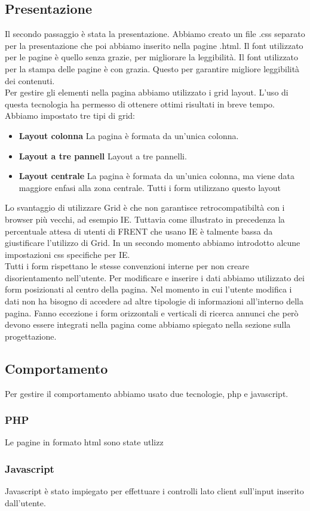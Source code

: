 \documentclass[1_relazione.tex]{subfiles}
\begin{document}
\subsection{Presentazione}
Il secondo passaggio è stata la presentazione.  Abbiamo creato un file .css separato per la presentazione che poi abbiamo inserito nella pagine .html. Il font utilizzato per le pagine è quello senza grazie, per migliorare la leggibilità. Il font utilizzato per la stampa delle pagine è con grazia. Questo per garantire migliore leggibilità dei contenuti.  \\

Per gestire gli elementi nella pagina abbiamo utilizzato i grid layout. L'uso di questa tecnologia ha permesso di ottenere ottimi risultati in breve tempo. Abbiamo impostato tre tipi di grid:
\begin{itemize}
\item \textbf{Layout colonna}  La pagina è formata da un'unica colonna.
\item \textbf{Layout a tre pannell} Layout a tre pannelli.
\item \textbf{Layout centrale} La pagina è formata da un'unica colonna, ma viene data maggiore enfasi alla zona centrale. Tutti i form utilizzano questo layout
\end{itemize}

Lo svantaggio di utilizzare Grid è che non garantisce retrocompatibiltà con i browser più vecchi, ad esempio IE. Tuttavia come illustrato in precedenza la percentuale attesa di utenti di FRENT che usano IE è talmente bassa da giustificare l'utilizzo di Grid. In un secondo momento abbiamo introdotto alcune impostazioni css specifiche per IE. \\

Tutti i form rispettano le stesse convenzioni interne per non creare disorientamento nell'utente. Per modificare e inserire i dati abbiamo utilizzato dei form posizionati al centro della pagina. Nel momento in cui l'utente modifica i dati non ha bisogno di accedere ad altre tipologie di informazioni all'interno della pagina. Fanno eccezione i form orizzontali e verticali di ricerca annunci che però devono essere integrati nella pagina come abbiamo spiegato nella sezione sulla progettazione. 

\subsection{Comportamento}
Per gestire il comportamento abbiamo usato due tecnologie, php e javascript.

\subsubsection{PHP}
Le pagine in formato html sono state utlizz


\subsubsection{Javascript}
Javascript è stato impiegato per effettuare i controlli lato client sull'input inserito dall'utente.
\end{document}
